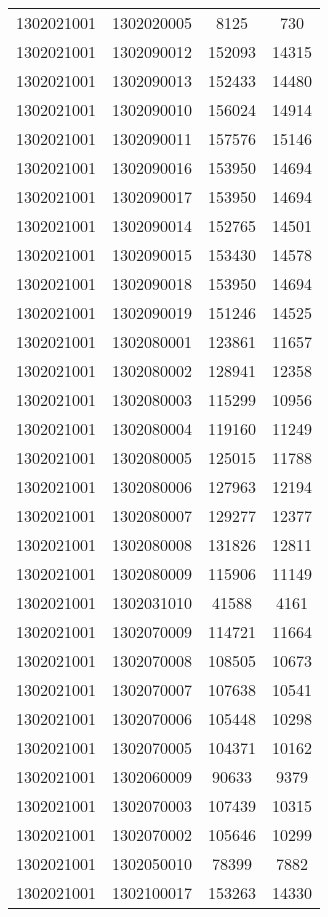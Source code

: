 \begin{longtable}[h]{llcc}
		1302021001 & 1302020005 & 8125 & 730\\
		1302021001 & 1302090012 & 152093 & 14315\\
		1302021001 & 1302090013 & 152433 & 14480\\
		1302021001 & 1302090010 & 156024 & 14914\\
		1302021001 & 1302090011 & 157576 & 15146\\
		1302021001 & 1302090016 & 153950 & 14694\\
		1302021001 & 1302090017 & 153950 & 14694\\
		1302021001 & 1302090014 & 152765 & 14501\\
		1302021001 & 1302090015 & 153430 & 14578\\
		1302021001 & 1302090018 & 153950 & 14694\\
		1302021001 & 1302090019 & 151246 & 14525\\
		1302021001 & 1302080001 & 123861 & 11657\\
		1302021001 & 1302080002 & 128941 & 12358\\
		1302021001 & 1302080003 & 115299 & 10956\\
		1302021001 & 1302080004 & 119160 & 11249\\
		1302021001 & 1302080005 & 125015 & 11788\\
		1302021001 & 1302080006 & 127963 & 12194\\
		1302021001 & 1302080007 & 129277 & 12377\\
		1302021001 & 1302080008 & 131826 & 12811\\
		1302021001 & 1302080009 & 115906 & 11149\\
		1302021001 & 1302031010 & 41588 & 4161\\
		1302021001 & 1302070009 & 114721 & 11664\\
		1302021001 & 1302070008 & 108505 & 10673\\
		1302021001 & 1302070007 & 107638 & 10541\\
		1302021001 & 1302070006 & 105448 & 10298\\
		1302021001 & 1302070005 & 104371 & 10162\\
		1302021001 & 1302060009 & 90633 & 9379\\
		1302021001 & 1302070003 & 107439 & 10315\\
		1302021001 & 1302070002 & 105646 & 10299\\
		1302021001 & 1302050010 & 78399 & 7882\\
		1302021001 & 1302100017 & 153263 & 14330\\

\end{longtable}
